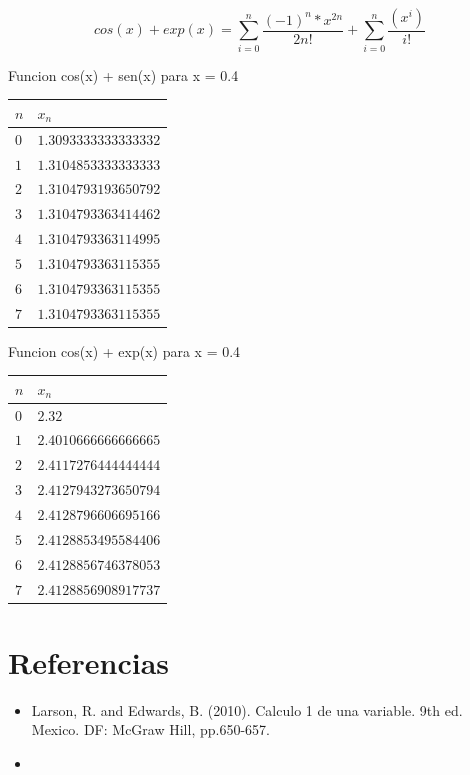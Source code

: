 \documentclass[12pt]{article}
\begin{document}
        \begin{equation}
            cos(x) + exp(x) = \sum_{i=0}^{n} \frac{(-1)^{n} * x^{2n}}{2n!} + \sum_{i=0}^{n} \frac{(x^{i})} {i!}
        \end{equation}

Funcion cos(x) + sen(x) para x = 0.4
        \begin{center}
            \begin{tabular}{|l|l|} \hline
            $n$ & $x_{n}$  \\
            \hline \hline
            $0$ & $1.3093333333333332$    \\
            \hline 
            $1$ & $1.3104853333333333$ \\
            \hline 
            $2$ & $1.3104793193650792$ \\
            \hline 
            $3$ & $1.3104793363414462$ \\
            \hline 
            $4$ & $1.3104793363114995$ \\
            \hline 
            $5$ & $1.3104793363115355$ \\
            \hline 
            $6$ & $1.3104793363115355$ \\
            \hline 
            $7$ & $1.3104793363115355$ \\
            \hline
            \end{tabular}
        \end{center}

Funcion cos(x) + exp(x) para x = 0.4
        \begin{center}
            \begin{tabular}{|l|l|} \hline
            $n$ & $x_{n}$  \\
            \hline \hline
            $0$ & $2.32$    \\
            \hline 
            $1$ & $2.4010666666666665$ \\
            \hline 
            $2$ & $2.4117276444444444$ \\
            \hline 
            $3$ & $2.4127943273650794$ \\
            \hline 
            $4$ & $2.4128796606695166$ \\
            \hline 
            $5$ & $2.4128853495584406$ \\
            \hline 
            $6$ & $2.4128856746378053$ \\
            \hline 
            $7$ & $2.4128856908917737$ \\
            \hline
            \end{tabular}
        \end{center}



        \section {Referencias}

        \begin{itemize}
        \item{Larson, R. and Edwards, B. (2010). Calculo 1 de una variable. 9th ed. Mexico. DF: McGraw Hill, pp.650-657.}
        \item{}
        \end{itemize}
\end{document}
